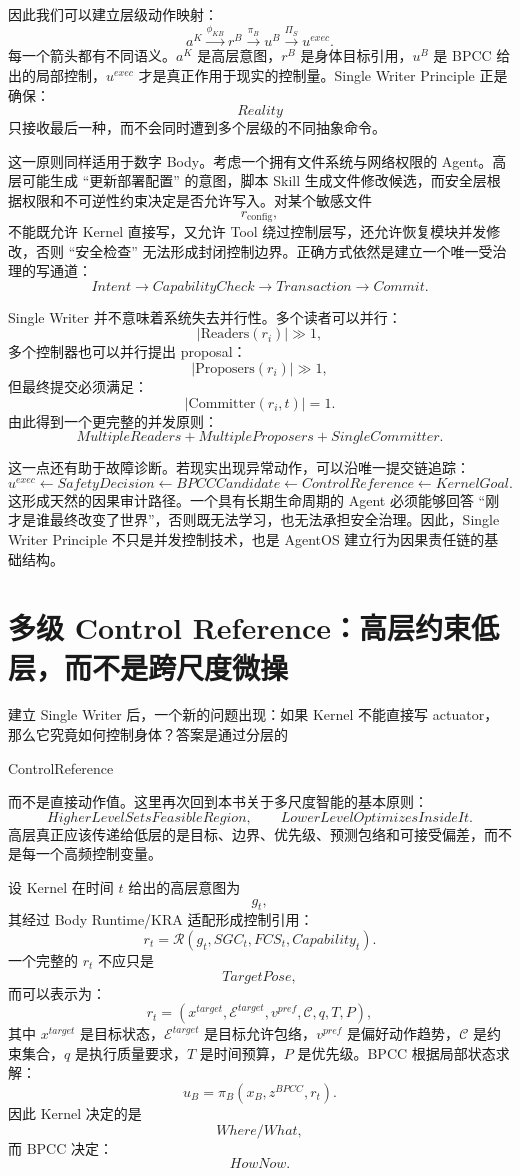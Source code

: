 因此我们可以建立层级动作映射：
\[
a^K
\overset{\phi_{KB}}{\longrightarrow}
r^B
\overset{\pi_B}{\longrightarrow}
u^B
\overset{\Pi_S}{\longrightarrow}
u^{exec}.
\]
每一个箭头都有不同语义。$a^K$ 是高层意图，$r^B$ 是身体目标引用，$u^B$ 是 BPCC 给出的局部控制，$u^{exec}$ 才是真正作用于现实的控制量。Single Writer Principle 正是确保：
\[
Reality
\]
只接收最后一种，而不会同时遭到多个层级的不同抽象命令。

这一原则同样适用于数字 Body。考虑一个拥有文件系统与网络权限的 Agent。高层可能生成 ``更新部署配置'' 的意图，脚本 Skill 生成文件修改候选，而安全层根据权限和不可逆性约束决定是否允许写入。对某个敏感文件
\[
r_{\mathrm{config}},
\]
不能既允许 Kernel 直接写，又允许 Tool 绕过控制层写，还允许恢复模块并发修改，否则 ``安全检查'' 无法形成封闭控制边界。正确方式依然是建立一个唯一受治理的写通道：
\[
Intent
\rightarrow
CapabilityCheck
\rightarrow
Transaction
\rightarrow
Commit.
\]

Single Writer 并不意味着系统失去并行性。多个读者可以并行：
\[
|\mathrm{Readers}(r_i)|\gg1,
\]
多个控制器也可以并行提出 proposal：
\[
|\mathrm{Proposers}(r_i)|\gg1,
\]
但最终提交必须满足：
\[
|\mathrm{Committer}(r_i,t)|=1.
\]
由此得到一个更完整的并发原则：
\[
\boxed{
MultipleReaders+
MultipleProposers+
SingleCommitter.
}
\]

这一点还有助于故障诊断。若现实出现异常动作，可以沿唯一提交链追踪：
\[
u^{exec}
\leftarrow
SafetyDecision
\leftarrow
BPCCCandidate
\leftarrow
ControlReference
\leftarrow
KernelGoal.
\]
这形成天然的因果审计路径。一个具有长期生命周期的 Agent 必须能够回答 ``刚才是谁最终改变了世界''，否则既无法学习，也无法承担安全治理。因此，Single Writer Principle 不只是并发控制技术，也是 AgentOS 建立行为因果责任链的基础结构。

\section{多级 Control Reference：高层约束低层，而不是跨尺度微操}

建立 Single Writer 后，一个新的问题出现：如果 Kernel 不能直接写 actuator，那么它究竟如何控制身体？答案是通过分层的
\begin{statementbox}
ControlReference
\end{statementbox}
而不是直接动作值。这里再次回到本书关于多尺度智能的基本原则：
\[
\boxed{
HigherLevelSetsFeasibleRegion,
\qquad
LowerLevelOptimizesInsideIt.
}
\]
高层真正应该传递给低层的是目标、边界、优先级、预测包络和可接受偏差，而不是每一个高频控制变量。

设 Kernel 在时间 $t$ 给出的高层意图为
\[
g_t,
\]
其经过 Body Runtime/KRA 适配形成控制引用：
\[
r_t
=
\mathcal R(
g_t,
SGC_t,
FCS_t,
Capability_t
).
\]
一个完整的 $r_t$ 不应只是
\[
TargetPose,
\]
而可以表示为：
\[
r_t
=
(
x^{target},
\mathcal E^{target},
v^{pref},
\mathcal C,
q,
T,
P
),
\]
其中 $x^{target}$ 是目标状态，$\mathcal E^{target}$ 是目标允许包络，$v^{pref}$ 是偏好动作趋势，$\mathcal C$ 是约束集合，$q$ 是执行质量要求，$T$ 是时间预算，$P$ 是优先级。BPCC 根据局部状态求解：
\[
u_B
=
\pi_B(
x_B,
z^{BPCC},
r_t
).
\]
因此 Kernel 决定的是
\[
Where/What,
\]
而 BPCC 决定：
\[
HowNow.
\]

